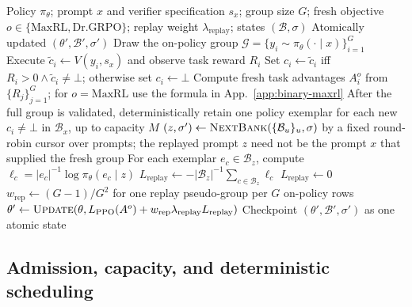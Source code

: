 \documentclass{article}
\newcommand{\1}{\mathbf 1}
\theoremstyle{remark}
\theoremstyle{definition}
\theoremstyle{plain}
\begin{document}
\begin{algorithm}[H]
  \caption{One verified-replay optimizer update: $o=\mathrm{Dr.GRPO}$
    gives Re:Dr, $o=\mathrm{MaxRL}$ gives Re:Max}
  \label{alg:verified-replay-update}
  \small
  \begin{algorithmic}[1]
    \REQUIRE Policy $\pi_\theta$; prompt $x$ and verifier specification
      $s_x$; group size $G$; fresh objective
      $o\in\{\mathrm{MaxRL},\mathrm{Dr.GRPO}\}$; replay weight
      $\lambda_{\mathrm{replay}}$; states $(\mathcal B,\sigma)$
    \ENSURE Atomically updated $(\theta',\mathcal B',\sigma')$
    \STATE Draw the on-policy group
      $\mathcal G=\{y_i\sim\pi_\theta(\cdot\mid x)\}_{i=1}^G$
      \STATE Execute $\widetilde c_i\gets V(y_i,s_x)$ and observe task
        reward $R_i$
      \STATE Set $c_i\gets\widetilde c_i$ iff
        $R_i>0\wedge\widetilde c_i\ne\bot$; otherwise set $c_i\gets\bot$
    \ENDFOR
    \STATE Compute fresh task advantages $A_i^{o}$ from $\{R_j\}_{j=1}^G$;
      for $o=\mathrm{MaxRL}$ use the formula in App.~\ref{app:binary-maxrl}
    \STATE After the full group is validated, deterministically retain one
      policy exemplar for each new $c_i\ne\bot$ in $\mathcal B_x$, up to
      capacity $M$
    \STATE $(z,\sigma')\gets\textsc{NextBank}
      (\{\mathcal B_u\}_u,\sigma)$ by a fixed round-robin cursor over
      prompts; the replayed prompt $z$ need not be the prompt $x$ that
      supplied the fresh group
      \STATE For each exemplar $e_c\in\mathcal B_z$, compute
        $\ell_c=|e_c|^{-1}\log\pi_\theta(e_c\mid z)$
      \STATE $L_{\mathrm{replay}}\gets-|\mathcal B_z|^{-1}
        \sum_{c\in\mathcal B_z}\ell_c$
    \ELSE
      \STATE $L_{\mathrm{replay}}\gets0$
    \ENDIF
    \STATE $w_{\mathrm{rep}}\gets(G-1)/G^2$ for one replay
      pseudo-group per $G$ on-policy rows
    \STATE $\theta'\gets\textsc{Update}
      (\theta,L_{\mathrm{PPO}}(A^{o})
      +w_{\mathrm{rep}}\lambda_{\mathrm{replay}}L_{\mathrm{replay}})$
    \STATE Checkpoint $(\theta',\mathcal B',\sigma')$ as one atomic state
\end{algorithmic}
\end{algorithm}

\subsection{Admission, capacity, and deterministic scheduling}
\label{app:algorithm-bank}
\end{document}
